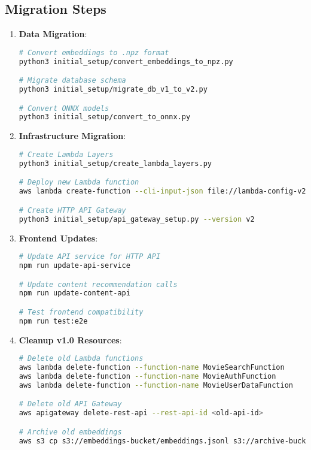 \documentclass[11pt,a4paper]{article}
\begin{document}
\subsection{Migration Steps}
\begin{enumerate}
  \item \textbf{Data Migration}:
    \begin{lstlisting}[language=bash]
# Convert embeddings to .npz format
python3 initial_setup/convert_embeddings_to_npz.py

# Migrate database schema
python3 initial_setup/migrate_db_v1_to_v2.py

# Convert ONNX models
python3 initial_setup/convert_to_onnx.py
    \end{lstlisting}
  
  \item \textbf{Infrastructure Migration}:
    \begin{lstlisting}[language=bash]
# Create Lambda Layers
python3 initial_setup/create_lambda_layers.py

# Deploy new Lambda function
aws lambda create-function --cli-input-json file://lambda-config-v2.json

# Create HTTP API Gateway
python3 initial_setup/api_gateway_setup.py --version v2
    \end{lstlisting}
  
  \item \textbf{Frontend Updates}:
    \begin{lstlisting}[language=bash]
# Update API service for HTTP API
npm run update-api-service

# Update content recommendation calls
npm run update-content-api

# Test frontend compatibility
npm run test:e2e
    \end{lstlisting}
  
  \item \textbf{Cleanup v1.0 Resources}:
    \begin{lstlisting}[language=bash]
# Delete old Lambda functions
aws lambda delete-function --function-name MovieSearchFunction
aws lambda delete-function --function-name MovieAuthFunction  
aws lambda delete-function --function-name MovieUserDataFunction

# Delete old API Gateway
aws apigateway delete-rest-api --rest-api-id <old-api-id>

# Archive old embeddings
aws s3 cp s3://embeddings-bucket/embeddings.jsonl s3://archive-bucket/
    \end{lstlisting}
\end{enumerate}
\end{document}
